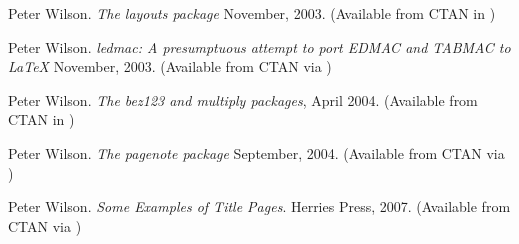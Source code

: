 \begin{thebibliography}{GMS94A}
\begin{comment}
\bibitem[Wil01k]{VERSE}
  Peter Wilson.
  \newblock \emph{Typesetting simple verse with LaTeX}
  \newblock July, 2001.
  \newblock (Available from CTAN in 
            \url{/macros/latex/contrib/verse})

\bibitem[Wil01l]{BOOKLET}
  Peter Wilson.
  \newblock \emph{Printing booklets with LaTeX}
  \newblock August, 2001.
  \newblock (Available from CTAN in 
            \url{/macros/latex/contrib/booklet})
\end{comment}

  Peter Wilson.
  \newblock \emph{The layouts package}
  \newblock November, 2003.
  \newblock (Available from CTAN in 
            )

  Peter Wilson.
  \newblock \emph{ledmac: A presumptuous attempt to port EDMAC and
    TABMAC to LaTeX}
  \newblock November, 2003.
  \newblock (Available from CTAN via 
            )

\begin{comment}
\bibitem[Wil04a]{GLISTER3}
  Peter Wilson.
  \newblock `Glisterings'.
  \newblock TUGboat, 25, 2 pp 201--202, 2004.
\end{comment}


Peter Wilson.
\newblock \emph{The bez123 and multiply packages}, April 2004.
\newblock (Available from CTAN in  )


  Peter Wilson.
  \newblock \emph{The pagenote package}
  \newblock September, 2004.
  \newblock (Available from CTAN via 
            )




  Peter Wilson.
  \newblock \emph{Some Examples of Title Pages}.
  \newblock Herries Press, 2007.
  \newblock (Available from CTAN via
  ) 

\begin{comment}
  \bibitem[Wil07b]{MEMCODE} Peter Wilson.  \newblock \emph{The \ltx\
      memoir class for configurable book typesetting: source code}
    \newblock November, 2007.  \newblock (Available from CTAN in
    \url{/macros/latex/contrib/memoir})
\end{comment}


\end{thebibliography}

